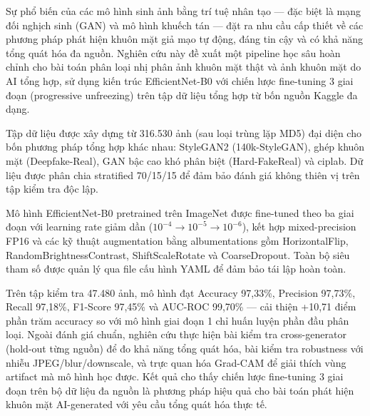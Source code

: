 Sự phổ biến của các mô hình sinh ảnh bằng trí tuệ nhân tạo --- đặc biệt là mạng đối nghịch sinh (GAN) và mô hình khuếch tán --- đặt ra nhu cầu cấp thiết về các phương pháp phát hiện khuôn mặt giả mạo tự động, đáng tin cậy và có khả năng tổng quát hóa đa nguồn. Nghiên cứu này đề xuất một pipeline học sâu hoàn chỉnh cho bài toán phân loại nhị phân ảnh khuôn mặt thật và ảnh khuôn mặt do AI tổng hợp, sử dụng kiến trúc EfficientNet-B0 \cite{tan2019efficientnet} với chiến lược fine-tuning 3 giai đoạn (progressive unfreezing) trên tập dữ liệu tổng hợp từ bốn nguồn Kaggle đa dạng.

Tập dữ liệu được xây dựng từ 316.530 ảnh (sau loại trùng lặp MD5) đại diện cho bốn phương pháp tổng hợp khác nhau: StyleGAN2 \cite{karras2020stylegan2} (140k-StyleGAN), ghép khuôn mặt (Deepfake-Real), GAN bậc cao khó phân biệt (Hard-FakeReal) và ciplab. Dữ liệu được phân chia stratified 70/15/15 để đảm bảo đánh giá không thiên vị trên tập kiểm tra độc lập.

Mô hình EfficientNet-B0 pretrained trên ImageNet được fine-tuned theo ba giai đoạn với learning rate giảm dần ($10^{-4} \to 10^{-5} \to 10^{-6}$), kết hợp mixed-precision FP16 và các kỹ thuật augmentation bằng albumentations \cite{buslaev2020albumentations} gồm HorizontalFlip, RandomBrightnessContrast, ShiftScaleRotate và CoarseDropout. Toàn bộ siêu tham số được quản lý qua file cấu hình YAML để đảm bảo tái lập hoàn toàn.

Trên tập kiểm tra 47.480 ảnh, mô hình đạt Accuracy 97,33\%, Precision 97,73\%, Recall 97,18\%, F1-Score 97,45\% và AUC-ROC 99,70\% --- cải thiện +10,71 điểm phần trăm accuracy so với mô hình giai đoạn 1 chỉ huấn luyện phần đầu phân loại. Ngoài đánh giá chuẩn, nghiên cứu thực hiện bài kiểm tra cross-generator (hold-out từng nguồn) để đo khả năng tổng quát hóa, bài kiểm tra robustness với nhiễu JPEG/blur/downscale, và trực quan hóa Grad-CAM \cite{selvaraju2017gradcam} để giải thích vùng artifact mà mô hình học được. Kết quả cho thấy chiến lược fine-tuning 3 giai đoạn trên bộ dữ liệu đa nguồn là phương pháp hiệu quả cho bài toán phát hiện khuôn mặt AI-generated với yêu cầu tổng quát hóa thực tế.
